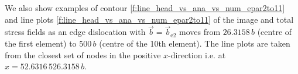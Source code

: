 \documentclass[11pt]{iopart}
\begin{document}
We also show examples of contour \cref{f:line_head_vs_ana_vs_num_epar2to11} and line plots \cref{f:line_head_vs_ana_vs_num_epar2to11} of the image and total stress fields as an edge dislocation with $\vec{b} = \vec{b}_{\textrm{e2}}$ moves from $26.3158\, b$ (centre of the first element) to $500\, b$ (centre of the 10th element). The line plots are taken from the closest set of nodes in the positive $x$-direction i.e. at $x = 52.6316\, 526.3158\, b$.
\begin{figure}
    \centering
    ~
    ~


\end{figure}
\end{document}
